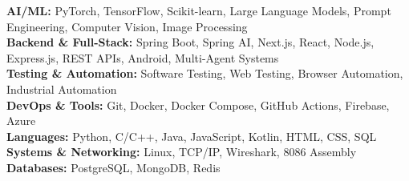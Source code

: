 \documentclass[a4paper,10pt]{article}
\begin{document}
\textbf{AI/ML:} PyTorch, TensorFlow, Scikit-learn, Large Language Models, Prompt Engineering, Computer Vision, Image Processing \\
\textbf{Backend \& Full-Stack:} Spring Boot, Spring AI, Next.js, React, Node.js, Express.js, REST APIs, Android, Multi-Agent Systems \\ 
\textbf{Testing \& Automation:} Software Testing, Web Testing, Browser Automation, Industrial Automation \\ 
\textbf{DevOps \& Tools:} Git, Docker, Docker Compose, GitHub Actions, Firebase, Azure \\ 
\textbf{Languages:} Python, C/C++, Java, JavaScript, Kotlin, HTML, CSS, SQL \\ 
\textbf{Systems \& Networking:} Linux, TCP/IP, Wireshark, 8086 Assembly \\ 
\textbf{Databases:} PostgreSQL, MongoDB, Redis
\end{document}
